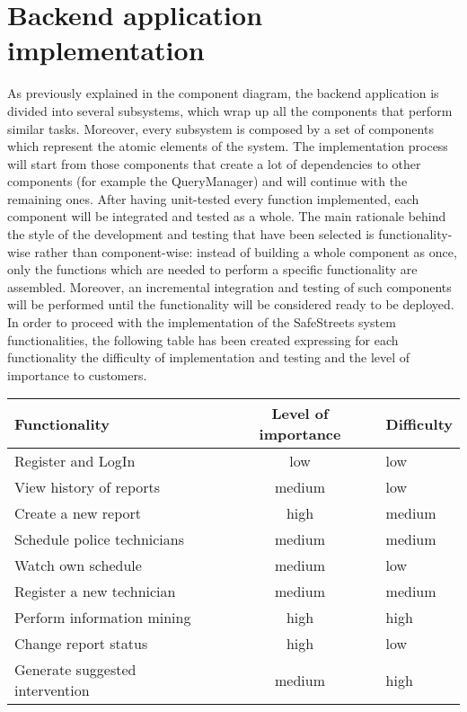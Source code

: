 \section{Backend application implementation}
As previously explained in the component diagram, the backend application is divided into several subsystems, which wrap up all the components that perform similar tasks. Moreover, every subsystem is composed by a set of components which represent the atomic elements of the system.
The implementation process will start from those components that create a lot of dependencies to other components (for example the QueryManager) and will continue with the remaining ones. After having unit-tested every function implemented, each component will be integrated and tested as a whole. 
The main rationale behind the style of the development and testing that have been selected is functionality-wise rather than component-wise: instead of building a whole component as once, only the functions which are needed to perform a specific functionality are assembled. Moreover, an incremental integration and testing of such components will be performed until the functionality will be considered ready to be deployed. In order to proceed with the implementation of the SafeStreets system functionalities, the following table has been created expressing for each functionality the difficulty of implementation and testing and the level of importance to customers.
\begin{table}[H]
    \renewcommand{\arraystretch}{0.9}
    \begin{tabularx}{\textwidth}{ |l|c|X| }
        \hline
        Functionality & Level of importance & Difficulty \\
        \hline
        Register and LogIn & low & low \\								
        \hline
        View history of reports & medium & low \\
        \hline
        Create a new report & high	& medium \\
        \hline								
        Schedule police technicians & medium & medium \\									
        \hline
        Watch own schedule & medium & low \\									
        \hline
        Register a new technician & medium & medium \\
        Perform information mining & high & high \\									
        \hline
        Change report status & high & low \\									
        \hline
        Generate suggested intervention & medium & high \\									
        \hline
    \end{tabularx}
  \end{table}

